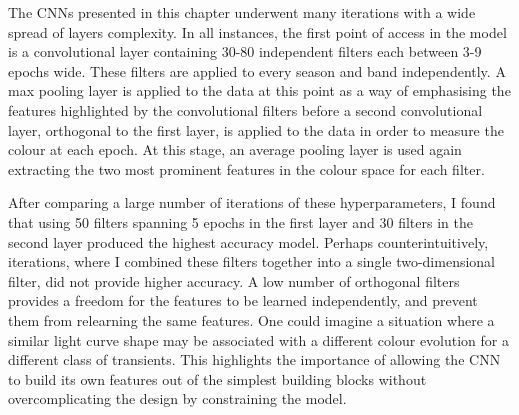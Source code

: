 The CNNs presented in this chapter underwent many iterations with a wide spread of layers complexity. In all instances, the first point of access in the model is a convolutional layer containing 30-80 independent filters each between 3-9 epochs wide. These filters are applied to every season and band independently. A max pooling layer is applied to the data at this point as a way of emphasising the features highlighted by the convolutional filters before a second convolutional layer, orthogonal to the first layer, is applied to the data in order to measure the colour at each epoch. At this stage, an average pooling layer is used again extracting the two most prominent features in the colour space for each filter.

After comparing a large number of iterations of these hyperparameters, I found that using 50 filters spanning 5 epochs in the first layer and 30 filters in the second layer produced the highest accuracy model. Perhaps counterintuitively, iterations, where I combined these filters together into a single two-dimensional filter, did not provide higher accuracy. A low number of orthogonal filters provides a freedom for the features to be learned independently, and prevent them from relearning the same features. One could imagine a situation where a similar light curve shape may be associated with a different colour evolution for a different class of transients. This highlights the importance of allowing the CNN to build its own features out of the simplest building blocks without overcomplicating the design by constraining the model.

